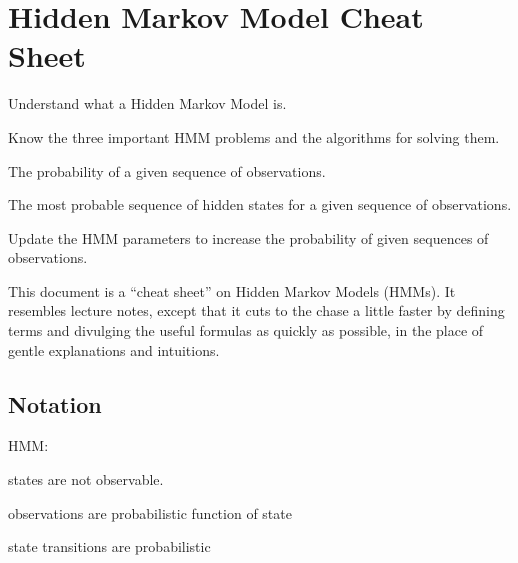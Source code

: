 \chapter{Hidden Markov Model Cheat Sheet} \label{sec:hmm-cheat}



\begin{learningobjectives}
\item Understand what a Hidden Markov Model is.
\item Know the three important HMM problems and the algorithms for
  solving them.
\item The probability of a given sequence of observations.
\item The most probable sequence of hidden states for a given sequence
  of observations.
\item Update the HMM parameters to increase the probability of given
  sequences of observations.
\end{learningobjectives}


This document is a ``cheat sheet'' on Hidden Markov Models (HMMs).  It
resembles lecture notes, except that it cuts to the chase a little
faster by defining terms and divulging the useful formulas as quickly
as possible, in the place of gentle explanations and intuitions.

\section{Notation}

HMM:
\begin{compactitem}
\item states are not observable.
\item observations are probabilistic function of state
\item state transitions are probabilistic
\end{compactitem}

